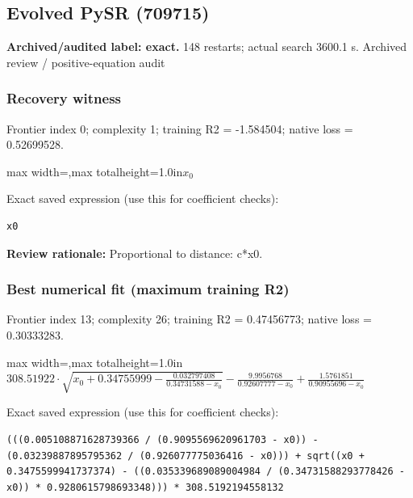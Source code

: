 \documentclass[10pt,letterpaper,landscape]{article}
\begin{document}
\begin{minipage}[t]{0.485\textwidth}
\subsection*{Evolved PySR (709715)}
\textbf{Archived/audited label: exact.} 148 restarts; actual search 3600.1 s.
{\small Archived review / positive-equation audit}
\subsubsection*{Recovery witness}
Frontier index 0; complexity 1; training R2 = -1.584504; native loss = 0.52699528.
\begin{center}\begin{adjustbox}{max width=\linewidth,max totalheight=1.0in}$\displaystyle x_{0}$\end{adjustbox}\end{center}
{\scriptsize Exact saved expression (use this for coefficient checks):}
\begin{lstlisting}
x0
\end{lstlisting}
{\small\textbf{Review rationale:} Proportional to distance: c*x0.}
\subsubsection*{Best numerical fit (maximum training R2)}
Frontier index 13; complexity 26; training R2 = 0.47456773; native loss = 0.30333283.
\begin{center}\begin{adjustbox}{max width=\linewidth,max totalheight=1.0in}$\displaystyle 308.51922 \cdot \sqrt{x_{0} + 0.34755999 - \frac{0.032797408}{0.34731588 - x_{0}}} - \frac{9.9956768}{0.92607777 - x_{0}} + \frac{1.5761851}{0.90955696 - x_{0}}$\end{adjustbox}\end{center}
{\scriptsize Exact saved expression (use this for coefficient checks):}
\begin{lstlisting}
(((0.005108871628739366 / (0.9095569620961703 - x0)) - (0.03239887895795362 / (0.926077775036416 - x0))) + sqrt((x0 + 0.3475599941737374) - ((0.035339689089004984 / (0.34731588293778426 - x0)) * 0.9280615798693348))) * 308.5192194558132
\end{lstlisting}
\end{minipage}
\clearpage{}\label{hubble-10001}
\end{document}
